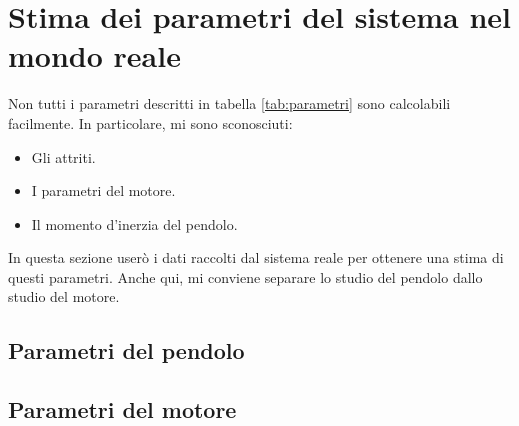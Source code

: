 \section{Stima dei parametri del sistema nel mondo reale}
Non tutti i parametri descritti in tabella \ref{tab:parametri} sono calcolabili facilmente. In particolare, mi sono sconosciuti:
\begin{itemize}
    \item Gli attriti.
    \item I parametri del motore.
    \item Il momento d'inerzia del pendolo.
\end{itemize}
In questa sezione userò i dati raccolti dal sistema reale per ottenere una stima di questi parametri. Anche qui, mi conviene separare lo studio del pendolo dallo studio del motore.

\subsection{Parametri del pendolo}



\subsection{Parametri del motore}
\label{subsec:parametri-motore}
